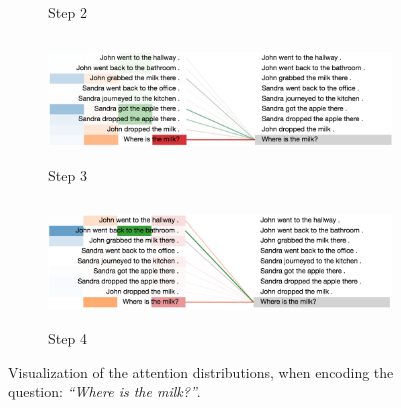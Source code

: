 \begin{figure}[!h]
\begin{minipage}{\textwidth}
\begin{subfigure}[t]{\textwidth}
        \caption{Step 2}
    \end{subfigure}
    \hfill \hfill
    \begin{subfigure}[t]{\textwidth}
        \centering
        \includegraphics[height=1.3in]{04-part-03/chapter-06/figs_and_tables/figs_attention_babi/e3-step3}
        \caption{Step 3}
    \end{subfigure}
    \hfill \hfill 
    \begin{subfigure}[t]{\textwidth}
        \centering
        \includegraphics[height=1.3in]{04-part-03/chapter-06/figs_and_tables/figs_attention_babi/e3-step4}
        \caption{Step 4}
    \end{subfigure}
    \end{minipage}
    \caption{Visualization of the attention distributions, when encoding the question: \emph{``Where is the milk?''}.}
\end{figure}

\afterpage{\clearpage}

